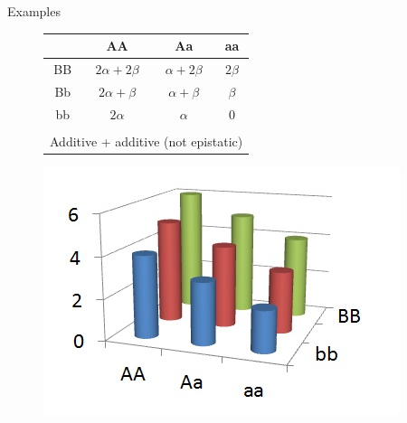 \documentclass{beamer}
\begin{document}
\begin{frame}{Examples}

\begin{figure}[htb]
 \centering
 \begin{minipage}[c]{0.38\textwidth}
  \centering
{\tiny
\begin{tabular}{cccc}
& AA & Aa & aa \\\hline
BB & $2\alpha + 2\beta$ & $\alpha + 2\beta$ & $2\beta$ \\
Bb & $2\alpha + \beta$ & $\alpha + \beta$ & $\beta$ \\
bb & $2\alpha$ & $\alpha$ & $0$ \\
&&&\\
\multicolumn{4}{l}{Additive + additive (not epistatic)}\\

\end{tabular} }
 \end{minipage}
 \begin{minipage}[c]{0.38\textwidth}
 \includegraphics[width=\textwidth]{additive.jpg}
 \end{minipage}
 \end{figure}


\end{frame}
\end{document}
